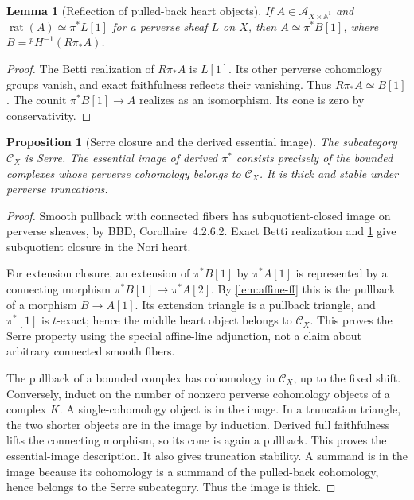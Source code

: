 \documentclass[11pt]{article}
\numberwithin{equation}{section}
\newtheorem{lemma}[lemma]{Lemma}
\newtheorem{proposition}[proposition]{Proposition}
\theoremstyle{definition}
\theoremstyle{remark}
\newcommand{\A}{\mathbb A}
\newcommand{\Ccal}{\mathcal C}
\newcommand{\rat}{\operatorname{rat}}
\newcommand{\pH}{{}^{p}\!H}
\begin{document}
\begin{lemma}[Reflection of pulled-back heart objects]\label{lem:ordinary-reflection}
If $A\in\mathcal A_{X\times\A^1}$ and
$\rat(A)\simeq\pi^*L[1]$ for a perverse sheaf $L$ on $X$, then
$A\simeq\pi^*B[1]$, where $B=\pH^{-1}(R\pi_*A)$.
\end{lemma}
\begin{proof}
The Betti realization of $R\pi_*A$ is $L[1]$. Its other perverse
cohomology groups vanish, and exact faithfulness reflects their vanishing.
Thus $R\pi_*A\simeq B[1]$. The counit
$\pi^*B[1]\to A$ realizes as an isomorphism. Its cone is zero by
conservativity.
\end{proof}

\begin{proposition}[Serre closure and the derived essential image]\label{prop:serre-derived}
The subcategory $\Ccal_X$ is Serre. The essential image of derived
$\pi^*$ consists precisely of the bounded complexes whose perverse
cohomology belongs to $\Ccal_X$. It is thick and stable under perverse
truncations.
\end{proposition}
\begin{proof}
Smooth pullback with connected fibers has subquotient-closed image on
perverse sheaves, by BBD, Corollaire~4.2.6.2. Exact Betti realization and
\cref{lem:ordinary-reflection} give subquotient closure in the Nori heart.

For extension closure, an extension of $\pi^*B[1]$ by $\pi^*A[1]$ is
represented by a connecting morphism
$\pi^*B[1]\to\pi^*A[2]$. By \cref{lem:affine-ff} this is the pullback
of a morphism $B\to A[1]$. Its extension triangle is a pullback triangle,
and $\pi^*[1]$ is $t$-exact; hence the middle heart object belongs to
$\Ccal_X$. This proves the Serre property using the special affine-line
adjunction, not a claim about arbitrary connected smooth fibers.

The pullback of a bounded complex has cohomology in $\Ccal_X$, up to the
fixed shift. Conversely, induct on the number of nonzero perverse
cohomology objects of a complex $K$. A single-cohomology object is in the
image. In a truncation triangle, the two shorter objects are in the image
by induction. Derived full faithfulness lifts the connecting morphism, so
its cone is again a pullback. This proves the essential-image description.
It also gives truncation stability. A summand is in the image because its
cohomology is a summand of the pulled-back cohomology, hence belongs to the
Serre subcategory. Thus the image is thick.
\end{proof}
\end{document}
